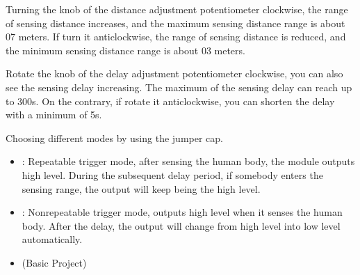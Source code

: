\documentclass[a4paper,11pt,english]{sphinxmanual}
\let\sphinxpxdimen\pdfpxdimen\else\newdimen\sphinxpxdimen
\begin{document}
\noindent{\hspace*{\fill}\sphinxincludegraphics[width=500\sphinxpxdimen]{{PIR3}.png}\hspace*{\fill}}

\sphinxAtStartPar
{}

\sphinxAtStartPar
Turning the knob of the distance adjustment potentiometer clockwise, the range of sensing distance increases, and the maximum sensing distance range is about 0\sphinxhyphen{}7 meters. If turn it anticlockwise, the range of sensing distance is reduced, and the minimum sensing distance range is about 0\sphinxhyphen{}3 meters.

\sphinxAtStartPar
{}

\sphinxAtStartPar
Rotate the knob of the delay adjustment potentiometer clockwise, you can also see the sensing delay increasing. The maximum of the sensing delay can reach up to 300s. On the contrary, if rotate it anticlockwise, you can shorten the delay with a minimum of 5s.

\sphinxAtStartPar
{}

\sphinxAtStartPar
Choosing different modes by using the jumper cap.
\begin{itemize}
\item {} 
\sphinxAtStartPar
{}: Repeatable trigger mode, after sensing the human body, the module outputs high level. During the subsequent delay period, if somebody enters the sensing range, the output will keep being the high level.

\item {} 
\sphinxAtStartPar
{}: Non\sphinxhyphen{}repeatable trigger mode, outputs high level when it senses the human body. After the delay, the output will change from high level into low level automatically.

\end{itemize}

\sphinxAtStartPar
{}
\begin{itemize}
\item {} 
\sphinxAtStartPar
{\hyperref[\detokenize{Basic_Project/PIR_Motion_Sensor:basic-pir-motion-sensor}]{}} (Basic Project)

\end{itemize}

\sphinxstepscope
\end{document}
